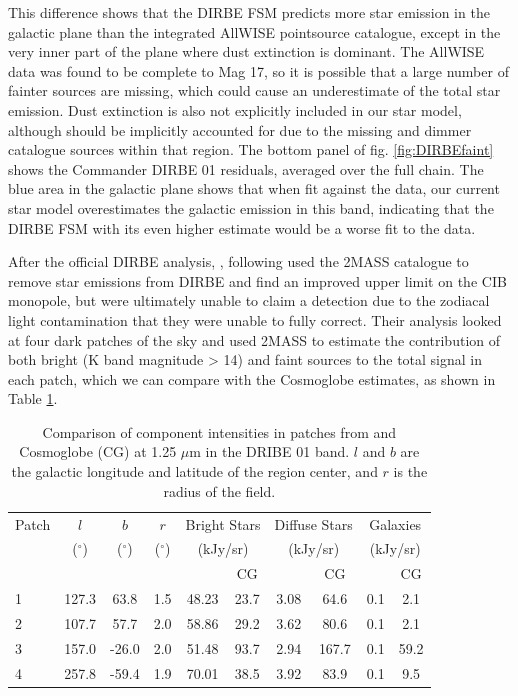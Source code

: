 \documentclass{aa}
\begin{document}
This difference shows that the DIRBE FSM predicts more star emission in the galactic plane than the integrated AllWISE pointsource catalogue, except in the very inner part of the plane where dust extinction is dominant. The AllWISE data was found to be complete to Mag 17, so it is possible that a large number of fainter sources are missing, which could cause an underestimate of the total star emission. Dust extinction is also not explicitly included in our star model, although should be implicitly accounted for due to the missing and dimmer catalogue sources within that region. The bottom panel of fig. \ref{fig:DIRBEfaint} shows the Commander DIRBE 01 residuals, averaged over the full chain. The blue area in the galactic plane shows that when fit against the data, our current star model overestimates the galactic emission in this band, indicating that the DIRBE FSM with its even higher estimate would be a worse fit to the data. 

After the official DIRBE analysis, \cite{DIRBE2mass}, following \cite{gorjian} used the 2MASS catalogue to remove star emissions from DIRBE and find an improved upper limit on the CIB monopole, but were ultimately unable to claim a detection due to the zodiacal light contamination that they were unable to fully correct. Their analysis looked at four dark patches of the sky and used 2MASS to estimate the contribution of both bright (K band magnitude > 14) and faint sources to the total signal in each patch, which we can compare with the Cosmoglobe estimates, as shown in Table \ref{tab:2mass}.

\begin{table}
    \centering
    \begin{tabular}{l c c c c c c c c c}
    \hline
    \hline
     Patch & $l$ & $b$ & $r$ & \multicolumn{2}{c}{Bright Stars} & \multicolumn{2}{c}{Diffuse Stars} & \multicolumn{2}{c}{Galaxies} \\ 
     & ($^{\circ}$) & ($^{\circ}$) & ($^{\circ}$) & \multicolumn{2}{c}{(kJy/sr)} & \multicolumn{2}{c}{(kJy/sr)} & \multicolumn{2}{c}{(kJy/sr)} \\
          &  & & & \cite{DIRBE2mass} & CG & \cite{DIRBE2mass} & CG & \cite{DIRBE2mass} & CG\\
    
     \hline
     1 \rule{0pt}{2ex} & 127.3 & 63.8  & 1.5 & 48.23 & 23.7 & 3.08 & 64.6 & 0.1 & 2.1\\
     2 & 107.7 & 57.7 & 2.0 & 58.86 & 29.2 & 3.62 & 80.6 & 0.1 & 2.1 \\
     3 & 157.0 & -26.0 & 2.0 & 51.48 & 93.7 & 2.94 & 167.7 & 0.1 & 59.2 \\
     4 & 257.8 & -59.4 & 1.9 & 70.01 & 38.5 & 3.92 & 83.9 & 0.1 & 9.5\\
     \hline
    \end{tabular}
    \caption{Comparison of component intensities in patches from \cite{DIRBE2mass} and Cosmoglobe (CG) at 1.25 $\mu$m in the DRIBE 01 band. $l$ and $b$ are the galactic longitude and latitude of the region center, and $r$ is the radius of the field.}
    \label{tab:2mass}
\end{table}
\end{document}
